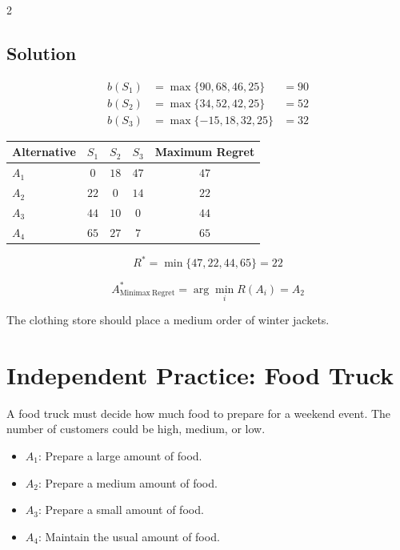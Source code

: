 \begin{multicols}{2}
		\subsection*{Solution}
		
		\[
		\begin{array}{lll}
			b(S_1) &= \max\{90,68,46,25\} &= 90 \\[3pt]
			b(S_2) &= \max\{34,52,42,25\} &= 52 \\[3pt]
			b(S_3) &= \max\{-15,18,32,25\} &= 32
		\end{array}
		\]
		
		\begin{center}
			\renewcommand{\arraystretch}{1.5}
			\small
			\begin{tabular}{lcccc}
				\toprule
				Alternative & $S_1$ & $S_2$ & $S_3$ & Maximum Regret \\
				\midrule
				$A_1$ & $0$ & $18$ & $47$ & $47$ \\
				$A_2$ & $22$ & $0$ & $14$ & $22$ \\
				$A_3$ & $44$ & $10$ & $0$ & $44$ \\
				$A_4$ & $65$ & $27$ & $7$ & $65$ \\
				\bottomrule
			\end{tabular}
		\end{center}
		
		\[
		R^*
		=
		\min\{47,22,44,65\}
		=
		22
		\]
		
		\[
		A^*_{\mathrm{Minimax\ Regret}}
		=
		\arg\min_i R(A_i)
		=
		A_2
		\]
		
		The clothing store should place a medium order of winter jackets.
		
		\section{Independent Practice: Food Truck}
		
		A food truck must decide how much food to prepare for a weekend event.
		The number of customers could be high, medium, or low.
		\begin{itemize}
			\item $A_1$: Prepare a large amount of food.
			\item $A_2$: Prepare a medium amount of food.
			\item $A_3$: Prepare a small amount of food.
			\item $A_4$: Maintain the usual amount of food.
		\end{itemize}
		

\end{multicols}
